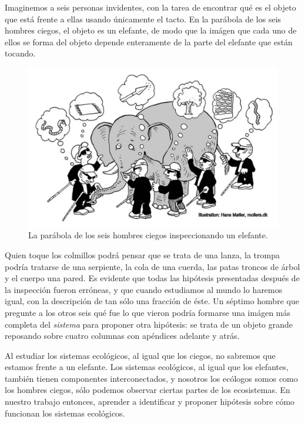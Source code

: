 \documentclass[
]{book}
\begin{document}
Imaginemos a seis personas invidentes, con la tarea de encontrar qué es el objeto que está frente a ellas usando únicamente el tacto. En la parábola de los seis hombres ciegos, el objeto es un elefante, de modo que la imágen que cada uno de ellos se forma del objeto depende enteramente de la parte del elefante que están tocando.

\begin{figure}

{\centering \includegraphics[width=16.17in]{Unidad-I/elefante} 

}

\caption{La parábola de los seis hombres ciegos inspeccionando un elefante.}\label{fig:unnamed-chunk-5}
\end{figure}

Quien toque los colmillos podrá pensar que se trata de una lanza, la trompa podría tratarse de una serpiente, la cola de una cuerda, las patas troncos de árbol y el cuerpo una pared. Es evidente que todas las hipótesis presentadas después de la inspección fueron erróneas, y que cuando estudiamos al mundo lo haremos igual, con la descripción de tan sólo una fracción de éste. Un séptimo hombre que pregunte a los otros seis qué fue lo que vieron podría formarse una imágen más completa del \emph{sistema} para proponer otra hipótesis: se trata de un objeto grande reposando sobre cuatro columnas con apéndices adelante y atrás.

Al estudiar los sistemas ecológicos, al igual que los ciegos, no sabremos que estamos frente a un elefante. Los sistemas ecológicos, al igual que los elefantes, también tienen componentes interconectados, y nosotros los ecólogos somos como los hombres ciegos, sólo podemos observar ciertas partes de los ecosistemas. En nuestro trabajo entonces, aprender a identificar y proponer hipótesis sobre cómo funcionan los sistemas ecológicos.
\end{document}
